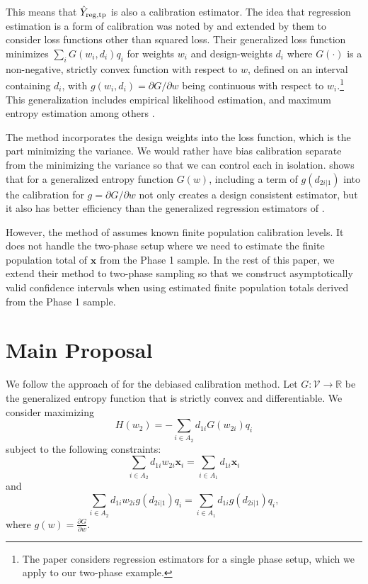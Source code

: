 \documentclass[12pt]{article}
\newcommand{\R}{\mathbb{R}}
\renewcommand{\bf}[1]{\mathbf{#1}}
\begin{document}
This means that $\hat Y_{\rm reg, tp}$ is also a calibration estimator. The idea
that regression estimation is a form of calibration was noted by
\cite{deville1992calibration} and extended by them to consider loss functions
other than squared loss. Their generalized loss function minimizes
$\sum_i G(w_i, d_i)q_i$ for weights $w_i$ and design-weights $d_i$ where
$G(\cdot)$ is a non-negative, strictly convex function with respect to $w$,
defined on an interval containing $d_i$, with $g(w_i, d_i) = \partial G /
\partial w$ being continuous with respect 
to $w_i$.\footnote{The \cite{deville1992calibration} paper
considers regression estimators for a single phase setup, which we apply to our
two-phase example.} This
generalization includes empirical likelihood estimation, and maximum entropy
estimation among others \citep{schennach2007point}. 

The \cite{deville1992calibration} method incorporates the design weights into
the loss function, which is the part minimizing the variance. We would rather
have bias calibration separate from the minimizing the variance so that
we can control each in isolation. 
\cite{kwon2024debiased} shows that for a generalized entropy
function $G(w)$, including a term of $g(d_{2i|1})$ into the calibration
for $g = \partial G / \partial w$ not only creates a design consistent
estimator, but it also has better efficiency than the generalized regression
estimators of \cite{deville1992calibration}.

However, the method of \cite{kwon2024debiased} assumes known finite population 
calibration levels. It does not handle the
two-phase setup where we need to estimate the finite population total of $\bf x$
from the Phase 1 sample. In the rest of this paper, we extend their method to 
two-phase sampling so that we construct asymptotically valid confidence
intervals when using estimated finite population totals derived from the Phase 1
sample.

\section{Main Proposal}

We follow the approach of \cite{kwon2024debiased} for the debiased calibration
method.  Let $G: \mathcal{V} \to \R$ be the generalized entropy function that is
strictly convex and differentiable. We consider maximizing 
\begin{equation}\label{eq:primalloss}
  H(w_2) = - \sum_{i \in A_2} d_{1i} G(w_{2i}) q_i
\end{equation}
subject to the following constraints:
\begin{equation}\label{eq:calconst1}
  \sum_{i \in A_2} d_{1i} w_{2i} \bf{x}_i = 
  \sum_{i \in A_1} d_{1i}\bf{x}_i
\end{equation}
and 
\begin{equation}\label{eq:calconst2}
  \sum_{i \in A_2} d_{1i} w_{2i} g(d_{2i|1})q_i = 
  \sum_{i \in A_1} d_{1i} g(d_{2i|1})q_i, 
\end{equation}
where $g(w) = \frac{\partial G}{\partial w}$. 
\end{document}

